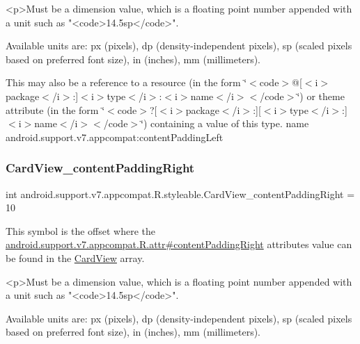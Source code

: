 \begin{DoxyVerb}      <p>Must be a dimension value, which is a floating point number appended with a unit such as "<code>14.5sp</code>".
\end{DoxyVerb}
 Available units are\+: px (pixels), dp (density-\/independent pixels), sp (scaled pixels based on preferred font size), in (inches), mm (millimeters). 

This may also be a reference to a resource (in the form \char`\"{}$<$code$>$@\mbox{[}$<$i$>$package$<$/i$>$\+:\mbox{]}$<$i$>$type$<$/i$>$\+:$<$i$>$name$<$/i$>$$<$/code$>$\char`\"{}) or theme attribute (in the form \char`\"{}$<$code$>$?\mbox{[}$<$i$>$package$<$/i$>$\+:\mbox{]}\mbox{[}$<$i$>$type$<$/i$>$\+:\mbox{]}$<$i$>$name$<$/i$>$$<$/code$>$\char`\"{}) containing a value of this type.  name android.\+support.\+v7.\+appcompat\+:content\+Padding\+Left \mbox{\label{classandroid_1_1support_1_1v7_1_1appcompat_1_1R_1_1styleable_a43d4e86a2f022aedbbe56703d2f7dc0e}} 
\subsubsection{\texorpdfstring{Card\+View\+\_\+content\+Padding\+Right}{CardView\_contentPaddingRight}}
{\footnotesize\ttfamily int android.\+support.\+v7.\+appcompat.\+R.\+styleable.\+Card\+View\+\_\+content\+Padding\+Right = 10\hspace{0.3cm}{\ttfamily [static]}}

This symbol is the offset where the \hyperlink{classandroid_1_1support_1_1v7_1_1appcompat_1_1R_1_1attr_a28810441733d8d355aaacfc0a5513bf8}{android.\+support.\+v7.\+appcompat.\+R.\+attr\#content\+Padding\+Right} attribute\textquotesingle{}s value can be found in the \hyperlink{classandroid_1_1support_1_1v7_1_1appcompat_1_1R_1_1styleable_aee2dd81febffbeeaeff51a35af0f87ec}{Card\+View} array.

\begin{DoxyVerb}      <p>Must be a dimension value, which is a floating point number appended with a unit such as "<code>14.5sp</code>".
\end{DoxyVerb}
 Available units are\+: px (pixels), dp (density-\/independent pixels), sp (scaled pixels based on preferred font size), in (inches), mm (millimeters). 

